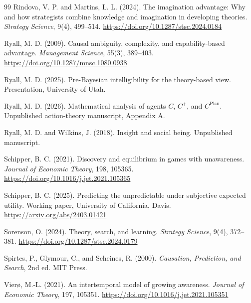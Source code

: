 \documentclass[11pt]{article}
\newcommand{\cplan}{C^{\mathrm{Plan}}}
\newcommand{\cplus}{C^{+}}
\begin{document}
\begin{thebibliography}{99}
		Rindova, V. P. and Martins, L. L. (2024).
		The imagination advantage: Why and how strategists combine knowledge and imagination in developing theories.
		\emph{Strategy Science}, 9(4), 499--514.
		\url{https://doi.org/10.1287/stsc.2024.0184}
		
		Ryall, M. D. (2009).
		Causal ambiguity, complexity, and capability-based advantage.
		\emph{Management Science}, 55(3), 389--403.
		\url{https://doi.org/10.1287/mnsc.1080.0938}
		
		Ryall, M. D. (2025).
		Pre-Bayesian intelligibility for the theory-based view.
		Presentation, University of Utah.
		
		Ryall, M. D. (2026).
		Mathematical analysis of agents $C$, $\cplus$, and $\cplan$.
		Unpublished action-theory manuscript, Appendix A.
		
		Ryall, M. D. and Wilkins, J. (2018).
		Insight and social being.
		Unpublished manuscript.
		
		Schipper, B. C. (2021).
		Discovery and equilibrium in games with unawareness.
		\emph{Journal of Economic Theory}, 198, 105365.
		\url{https://doi.org/10.1016/j.jet.2021.105365}
		
		Schipper, B. C. (2025).
		Predicting the unpredictable under subjective expected utility.
		Working paper, University of California, Davis.
		\url{https://arxiv.org/abs/2403.01421}
		
		Sorenson, O. (2024).
		Theory, search, and learning.
		\emph{Strategy Science}, 9(4), 372--381.
		\url{https://doi.org/10.1287/stsc.2024.0179}
		
		Spirtes, P., Glymour, C., and Scheines, R. (2000).
		\emph{Causation, Prediction, and Search}, 2nd ed.
		MIT Press.
		
		Vier\o, M.-L. (2021).
		An intertemporal model of growing awareness.
		\emph{Journal of Economic Theory}, 197, 105351.
		\url{https://doi.org/10.1016/j.jet.2021.105351}
		
	\end{thebibliography}
	
\end{document}
